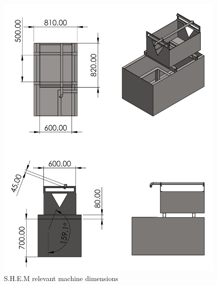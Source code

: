 \begin{figure}[H]
    \centering
    \includegraphics[width=\textwidth,height=.9\textheight]{Figures/MainReservoir.PNG}
    \caption{S.H.E.M relevant machine dimensions}
\end{figure}